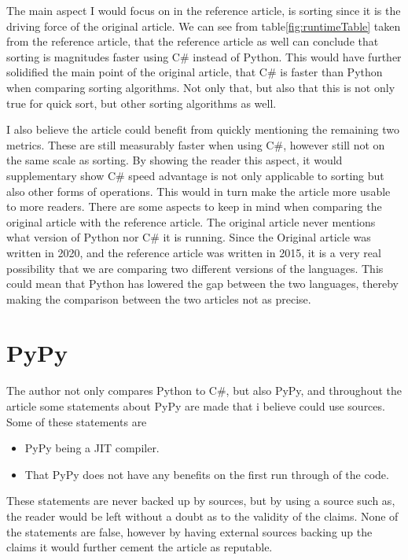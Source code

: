 \documentclass{article}
\begin{document}
The main aspect I would focus on in the reference article, is sorting since it is the driving force of the original article. We can see from table\ref{fig:runtimeTable} taken from the reference article, that the reference article as well can conclude that sorting is magnitudes faster using C\# instead of Python. This would have further solidified the main point of the original article, that C\# is faster than Python when comparing sorting algorithms. Not only that, but also that this is not only true for quick sort, but other sorting algorithms as well.
 
I also believe the article could benefit from quickly mentioning the remaining two metrics. These are still measurably faster when using C\#, however still not on the same scale as sorting. By showing the reader this aspect, it would supplementary show C\# speed advantage is not only applicable to sorting but also other forms of operations. This would in turn make the article more usable to more readers.
There are some aspects to keep in mind when comparing the original article with the reference article. The original article never mentions what version of Python nor C\# it is running. Since the Original article was written in 2020, and the reference article was written in 2015, it is a very real possibility that we are comparing two different versions of the languages. This could mean that Python has lowered the gap between the two languages, thereby making the comparison between the two articles not as precise.
 
\section*{PyPy}
 
The author not only compares Python to C\#, but also PyPy, and throughout the article some statements about PyPy are made that i believe could use sources. Some of these statements are
\begin{itemize}
 \item PyPy being a JIT compiler.
 \item That PyPy does not have any benefits on the first run through of the code.
\end{itemize}
These statements are never backed up by sources, but by using a source such as\cite{pypy}, the reader would be left without a doubt as to the validity of the claims. None of the statements are false, however by having external sources backing up the claims it would further cement the article as reputable.
 
\end{document}
